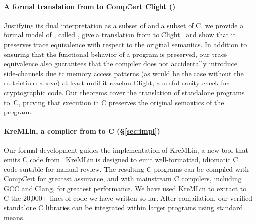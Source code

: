 \paragraph*{A formal translation from \lowstar to Comp\-Cert Clight ()}
Justifying its dual interpretation as a subset of \fstar and a subset of C,
we provide a formal model of \lowstar, called \lamstar,
give a translation from \lamstar to %
Clight~\cite{Blazy-Leroy-Clight-09} and show that it
preserves %
trace equivalence with respect to the original
\fstar semantics. In addition to ensuring that the
functional behavior of a program is preserved, our trace equivalence also
guarantees that the compiler does not accidentally introduce 
side-channels due to %
memory access patterns (as would be the case without the restrictions above)
at least until it reaches Clight, a useful sanity check for cryptographic code.
%
Our theorems cover the translation of standalone \lamstar
programs to~C, proving that execution in C preserves the original
\fstar semantics of the \lamstar program. 

\paragraph*{%
KreMLin, a compiler from \lowstar to C (\S\ref{sec:impl})}
Our formal development guides the implementation of KreMLin, a new
tool that emits C code from \lowstar. KreMLin is designed to emit
well-formatted, idiomatic C code suitable for manual review.
The resulting C programs can be
compiled with Comp\-Cert for greatest assurance, and with mainstream C
compilers, including GCC and Clang, for greatest performance.  
We have used KreMLin to extract to C the 20,000+ lines of 
\lowstar code we have written so far.
%
After compilation, our verified standalone C libraries can be
integrated within larger programs using standard means.

